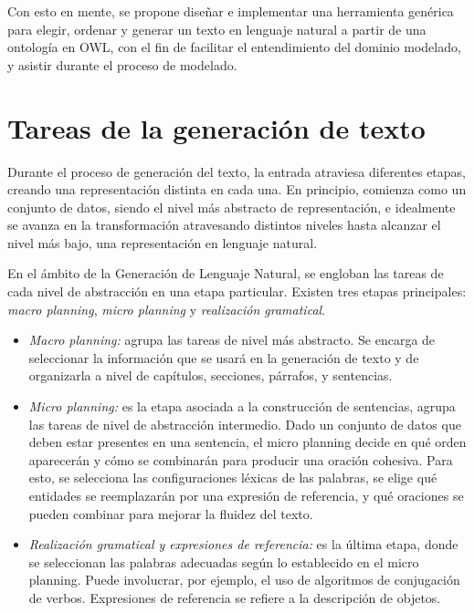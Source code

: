Con esto en mente, se propone diseñar e implementar una herramienta genérica para elegir, ordenar y generar un texto en lenguaje natural a partir de una ontología en OWL, con el fin de facilitar el entendimiento del dominio modelado, y asistir durante el proceso de modelado. %


\section{Tareas de la generación de texto}
\label{sec:tareas_gnl}
Durante el proceso de generación del texto, la entrada atraviesa diferentes etapas, creando una representación distinta en cada una. En principio, comienza como un conjunto de datos, siendo el nivel más abstracto de representación, e idealmente se avanza en la transformación atravesando distintos niveles hasta alcanzar el nivel más bajo, una representación en lenguaje natural. 

En el ámbito de la Generación de Lenguaje Natural, se engloban las tareas de cada nivel de abstracción en una etapa particular. Existen tres etapas principales: \emph{macro planning}, \emph{micro planning} y \emph{realización gramatical}.

\begin{itemize}
    \item  \emph{Macro planning:} agrupa las tareas de nivel más abstracto. Se encarga de seleccionar la información que se usará en la generación de texto y de organizarla a nivel de capítulos, secciones, párrafos, y sentencias.
    \item \emph{Micro planning:} es la etapa asociada a la construcción de sentencias, agrupa las tareas de nivel de abstracción intermedio. Dado un conjunto de datos que deben estar presentes en una sentencia, el micro planning decide en qué orden aparecerán y cómo se combinarán para producir una oración cohesiva. 
    Para esto, se selecciona las configuraciones léxicas de las palabras, se elige qué entidades se reemplazarán por una expresión de referencia, y qué oraciones se pueden combinar para mejorar la fluidez del texto.
    \item \emph{Realización gramatical y expresiones de referencia:} es la última etapa, donde se seleccionan las palabras adecuadas según lo establecido en el micro planning. Puede involucrar, por ejemplo, el uso de algoritmos de conjugación de verbos. Expresiones de referencia se refiere a la descripción de objetos.
\end{itemize}


